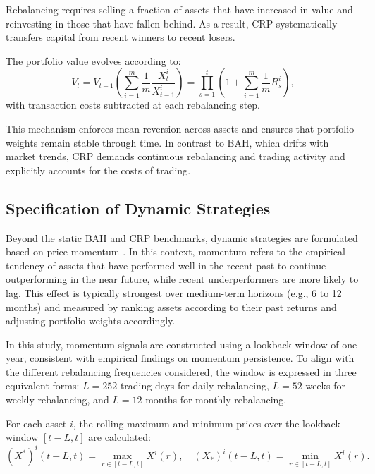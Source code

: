 \documentclass[12pt,a4paper]{report}
\begin{document}
Rebalancing requires selling a fraction of assets that have increased in value and reinvesting in those that have fallen behind. As a result, CRP systematically transfers capital from recent winners to recent losers.

The portfolio value evolves according to:
\begin{equation}
V_t = V_{t-1} \left( \sum_{i=1}^m \frac{1}{m} \frac{X^i_t}{X^i_{t-1}} \right) = \prod_{s=1}^{t} \left(1 + \sum_{i=1}^m \frac{1}{m} R^i_s \right),
\label{eq:crp_value}
\end{equation}
with transaction costs subtracted at each rebalancing step.

This mechanism enforces mean-reversion across assets and ensures that portfolio weights remain stable through time. In contrast to BAH, which drifts with market trends, CRP demands continuous rebalancing and trading activity and explicitly accounts for the costs of trading.

\subsection{Specification of Dynamic Strategies}
\label{subsec:dynamics}

Beyond the static BAH and CRP benchmarks, dynamic strategies are formulated based on price momentum \citep{Jegadeesh1993, DeBondt1985}. In this context, momentum refers to the empirical tendency of assets that have performed well in the recent past to continue outperforming in the near future, while recent underperformers are more likely to lag. This effect is typically strongest over medium-term horizons (e.g., 6 to 12 months) and measured by ranking assets according to their past returns and adjusting portfolio weights accordingly. 

In this study, momentum signals are constructed using a lookback window of one year, consistent with empirical findings on momentum persistence. To align with the different rebalancing frequencies considered, the window is expressed in three equivalent forms: \( L = 252 \) trading days for daily rebalancing, \( L = 52 \) weeks for weekly rebalancing, and \( L = 12 \) months for monthly rebalancing. 

For each asset \( i \), the rolling maximum and minimum prices over the lookback window \([t-L, t]\) are calculated:
\begin{equation}
(X^*)^i(t-L, t) = \max_{r \in [t-L, t]} X^i(r), \quad (X_*)^i(t-L, t) = \min_{r \in [t-L, t]} X^i(r).
\label{eq:roll_max_min}
\end{equation}
\end{document}
